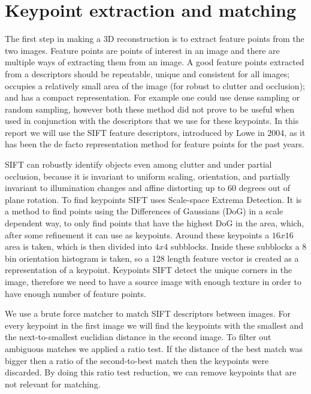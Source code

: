 \section{Keypoint extraction and matching}
\label{matching}
The first step in making a 3D reconstruction is to extract feature points from the two images.
Feature points are points of interest in an image and there are multiple ways of extracting them from an image.
A good feature points extracted from a descriptors should be repeatable, unique and consistent for all images;
occupies a relatively small area of the image (for robust to clutter and occlusion); and has a compact representation.
For example one could use dense sampling \cite{DSIFT} or random sampling,
however both these method did not prove to be useful when used in conjunction with the descriptors that we use for these keypoints.
In this report we will use the SIFT feature descriptors, introduced by Lowe\cite{SIFT} in 2004, as it has been the de facto representation method for feature points for the past years.

SIFT can robustly identify objects even among clutter and under partial occlusion, because it is invariant to uniform scaling, orientation, and partially invariant to illumination changes and affine distorting up to 60 degrees out of plane rotation.
To find keypoints SIFT uses Scale-space Extrema Detection.
It is a method to find points using the Differences of Gaussians (DoG) in a scale dependent way, to only find points that have the highest DoG in the area, which, after some refinement it can use as keypoints.
Around these keypoints a $16x16$ area is taken, which is then divided into $4x4$ subblocks.
Inside these subblocks a 8 bin orientation histogram is taken, so a 128 length feature vector is created as a representation of a keypoint.
Keypoints SIFT detect the unique corners in the image, therefore we need to have a source image with enough texture in order to have enough number of feature points.

We use a brute force matcher to match SIFT descriptors between images. 
For every keypoint in the first image we will find the keypoints with the smallest and the next-to-smallest euclidian distance in the second image. 
To filter out ambiguous matches we applied a ratio test. 
If the distance of the best match was bigger then a ratio of the second-to-best match then the keypoints were discarded.
By doing this ratio test reduction, we can remove keypoints that are not relevant for matching.

